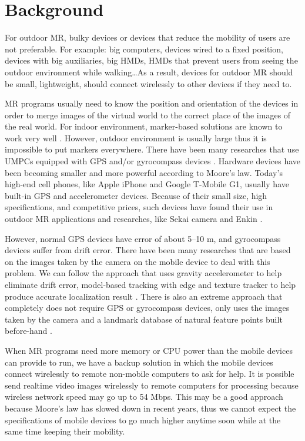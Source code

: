 
\section{Background}

For outdoor MR, bulky devices or devices that reduce the mobility of users are not preferable. For example: big computers, devices wired to a fixed position, devices with big auxiliaries, big HMDs, HMDs that prevent users from seeing the outdoor environment while walking\ldots As a result, devices for outdoor MR should be small, lightweight, should connect wirelessly to other devices if they need to.

MR programs usually need to know the position and orientation of the devices in order to merge images of the virtual world to the correct place of the images of the real world. For indoor environment, marker-based solutions are known to work very well \cite{Reference20}. However, outdoor environment is usually large thus it is impossible to put markers everywhere. There have been many researches that use UMPCs equipped with GPS and/or gyrocompass devices \cite{Reference2} \cite{Reference4} \cite{Reference13}. Hardware devices have been becoming smaller and more powerful according to Moore's law. Today's high-end cell phones, like Apple iPhone and Google T-Mobile G1, usually have built-in GPS and accelerometer devices. Because of their small size, high specifications, and competitive prices, such devices have found their use in outdoor MR applications and researches, like Sekai camera \cite{Reference18} and Enkin \cite{Reference19}.

However, normal GPS devices have error of about 5--10 m, and gyrocompass devices suffer from drift error. There have been many researches that are based on the images taken by the camera on the mobile device to deal with this problem. We can follow the approach that uses gravity accelerometer to help eliminate drift error, model-based tracking with edge and texture tracker to help produce accurate localization result \cite{Reference13}. There is also an extreme approach that completely does not require GPS or gyrocompass devices, only uses the images taken by the camera and a landmark database of natural feature points built before-hand \cite{Reference21}.

When MR programs need more memory or CPU power than the mobile devices can provide to run, we have a backup solution in which the mobile devices connect wirelessly to remote non-mobile computers to ask for help. It is possible send realtime video images wirelessly to remote computers for processing because wireless network speed may go up to 54 Mbps. This may be a good approach because Moore's law has slowed down in recent years, thus we cannot expect the specifications of mobile devices to go much higher anytime soon while at the same time keeping their mobility.

